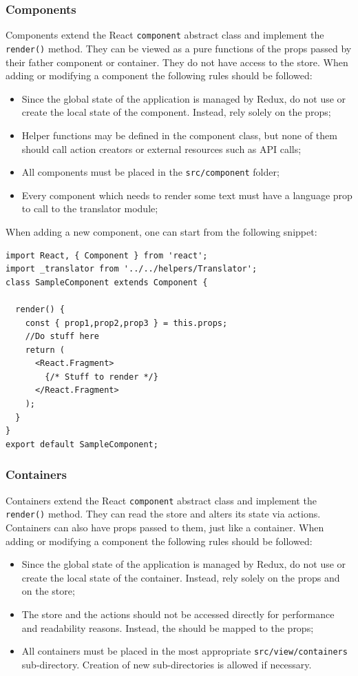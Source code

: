 \subsubsection{Components}
Components extend the React \texttt{component} abstract class and implement the \texttt{render()} method. They can be viewed as a pure functions of the props passed by their father component or container. They do not have access to the store. When adding or modifying a component the following rules should be followed:
\begin{itemize}
	\item Since the global state of the application is managed by Redux, do not use or create the local state of the component. Instead, rely solely on the props;
	\item Helper functions may be defined in the component class, but none of them should call action creators or external resources such as API calls;
	\item All components must be placed in the \texttt{src/component} folder;
	\item Every component which needs to render some text must have a language prop to call to the translator module;
\end{itemize}
When adding a new component, one can start from the following snippet:
\begin{lstlisting}
import React, { Component } from 'react';
import _translator from '../../helpers/Translator';
class SampleComponent extends Component {

  render() {
    const { prop1,prop2,prop3 } = this.props;
    //Do stuff here
    return (
      <React.Fragment>
        {/* Stuff to render */}
      </React.Fragment>
    );
  }
}
export default SampleComponent;
\end{lstlisting}


\subsubsection{Containers}
Containers extend the React \texttt{component} abstract class and implement the \texttt{render()} method. They can read the store and alters its state via actions. Containers can also have props passed to them, just like a container. When adding or modifying a component the following rules should be followed:
\begin{itemize}
	\item Since the global state of the application is managed by Redux, do not use or create the local state of the container. Instead, rely solely on the props and on the store;
	\item The store and the actions should not be accessed directly for performance and readability reasons. Instead, the should be mapped to the props;
	\item All containers must be placed in the most appropriate \texttt{src/view/containers} sub-directory. Creation of new sub-directories is allowed if necessary.
\end{itemize}


